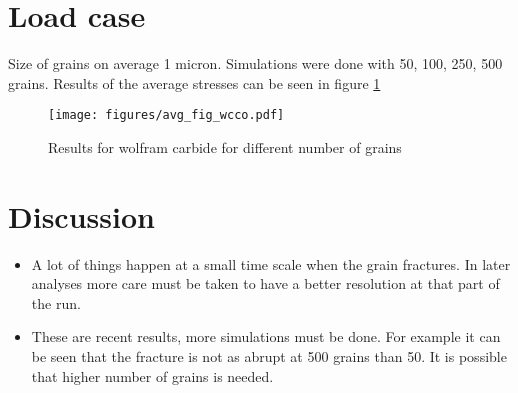 \documentclass[wcco.tex]{subfiles}
\begin{document}
\section{Load case}
Size of grains on average 1 micron. Simulations were done with 50, 100, 250, 500 grains. Results of the average stresses can be seen in figure \ref{fig:wcco_res}

\begin{figure}[ht]
\centering
\texttt{[image: figures/avg\_fig\_wcco.pdf]}
\caption{Results for wolfram carbide for different number of grains}
\label{fig:wcco_res}
\end{figure}


\section{Discussion}
\begin{itemize}
\item A lot of things happen at a small time scale when the grain fractures. In later analyses more care must be taken to have a better resolution at that part of the run.
\item These are recent results, more simulations must be done. For example it can be seen that the fracture is not as abrupt at 500 grains than 50. It is possible that higher number of grains is needed.
\end{itemize}
\end{document}
